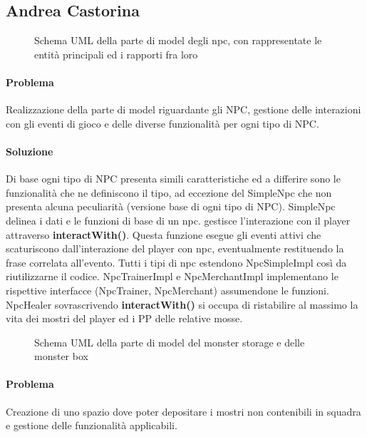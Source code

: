 
\subsection*{Andrea Castorina}
\begin{figure}[H]
\centering

\caption{Schema UML della parte di model degli npc, con rappresentate le entità principali ed i rapporti fra loro}
\label{img:Npc_UML}
\end{figure}

\paragraph{Problema}
Realizzazione della parte di model riguardante gli NPC, gestione delle interazioni con gli eventi di gioco e delle diverse funzionalità per ogni tipo di NPC.   

\paragraph{Soluzione}
Di base ogni tipo di NPC presenta simili caratteristiche ed a differire sono le funzionalità che ne definiscono il tipo, ad eccezione del SimpleNpc che non presenta alcuna peculiarità (versione base di ogni tipo di NPC).
SimpleNpc delinea i dati e le funzioni di base di un npc. gestisce l'interazione con il player attraverso \textbf{interactWith()}.
Questa funzione esegue gli eventi attivi che scaturiscono dall'interazione del player con npc, eventualmente restituendo la frase correlata all'evento.
Tutti i tipi di npc estendono NpcSimpleImpl così da riutilizzarne il codice.
NpcTrainerImpl e NpcMerchantImpl implementano le rispettive interfacce (NpcTrainer, NpcMerchant) assumendone le funzioni.  
NpcHealer sovrascrivendo \textbf{interactWith()} si occupa di ristabilire al massimo la vita dei mostri del player ed i PP delle relative mosse. 

\begin{figure}[H]
\centering

\caption{Schema UML della parte di model del monster storage e delle monster box}
\label{img:MonsterStorage_UML}
\end{figure}

\paragraph{Problema}
Creazione di uno spazio dove poter depositare i mostri non
contenibili in squadra e gestione delle funzionalità applicabili. 

